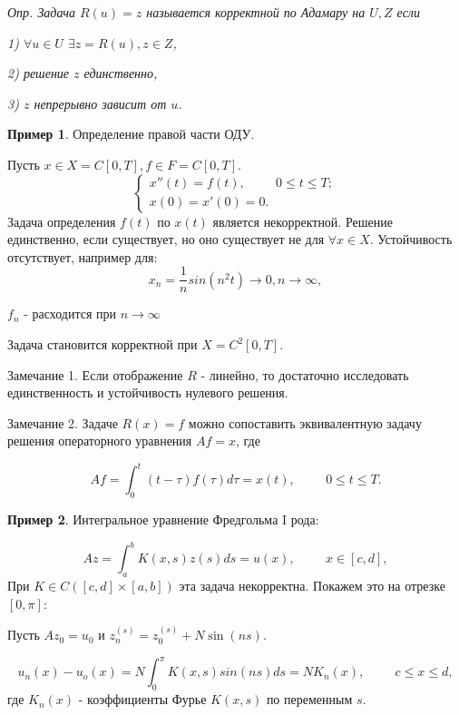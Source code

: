 \documentclass{article}
\begin{document}
\smallskip

\textit{Опр. Задача $R(u) = z$ называется корректной по Адамару на $U,Z$ если}

\textit{1) $\forall u \in U$ $\exists z = R(u), z \in Z$,}

\textit{2) решение $z$ единственно,}

\textit{3) $z$ непрерывно зависит от $u$.}


\bigskip
\textbf{Пример 1}. Определение правой части ОДУ.

Пусть $x \in X = C[0,T], f \in F = C[0,T]$.
$$
\begin{cases}
x''(t) = f(t), \hspace{1cm} 0 \leqslant t \leqslant T;\\
x(0) = x'(0) = 0.
\end{cases}
$$ 
Задача определения $f(t)$ по $x(t)$ является некорректной.
Решение единственно, если существует, но оно существует не для $\forall x \in X$.
Устойчивость отсутствует, например для:\\
$$
x_n = \frac{1}{n} sin(n^2t) \rightarrow 0, n \rightarrow \infty ,
$$

$f_n$ - расходится при $n \rightarrow \infty $

Задача становится корректной при $X = C^2[0,T]$.

\bigskip

Замечание 1. Если отображение $R$ - линейно, то достаточно исследовать единственность и устойчивость нулевого решения.

Замечание 2. Задаче $R(x) = f$ можно сопоставить эквивалентную задачу решения операторного уравнения $Af = x$, где

$$
Af = \int_0^t (t - \tau) f(\tau) d \tau = x(t), \hspace{1cm} 0 \leqslant t \leqslant T.
$$

\bigskip

\textbf{Пример 2}. Интегральное уравнение Фредгольма I рода:

$$
Az = \int_a^b K(x,s) z(s) ds = u(x),  \hspace{1cm} x \in [c,d],
$$
При $K \in C([c,d] \times [a,b])$ эта задача некорректна.
Покажем это на отрезке $[0,\pi]$:

Пусть $Az_0 = u_0$ и $z_n^{(s)} = z_0^{(s)} + N \sin (ns)$.

$$
u_n(x) - u_o(x) = N \int_0^{\pi} K(x,s) sin(ns) ds = N K_n(x),  \hspace{1cm} c \leqslant x \leqslant d,  
$$
где $K_n(x)$ - коэффициенты Фурье $K(x,s)$ по переменным $s$.
\end{document}
